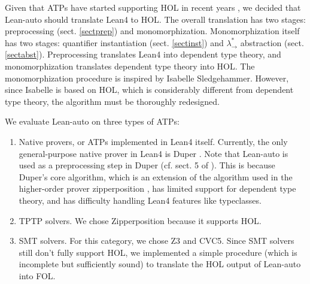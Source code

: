   Given that ATPs have started supporting HOL in recent years \cite{HOVampire}\cite{ZipperpositionMakeWork}\cite{HOEProver},
  we decided that Lean-auto should translate Lean4 to HOL. The overall translation has
  two stages: preprocessing (sect. \ref{sectprep}) and monomorphization.
  Monomorphization itself has two stages: quantifier instantiation (sect. \ref{sectinst})
  and $\lambda_\to^*$ abstraction (sect. \ref{sectabst}). Preprocessing translates Lean4
  into dependent type theory, and monomorphization translates dependent type theory
  into HOL. The monomorphization procedure is inspired by Isabelle Sledgehammer.
  However, since Isabelle is based on HOL, which is considerably different from
  dependent type theory, the algorithm must be thoroughly redesigned.
  
  We evaluate Lean-auto on three types of ATPs:
  \begin{enumerate}
    \item Native provers, or ATPs implemented in Lean4 itself. Currently, the only general-purpose
      native prover in Lean4 is Duper \cite{DuperPaper}. Note that Lean-auto is
      used as a preprocessing step in Duper (cf. sect. 5 of \cite{DuperPaper}).
      This is because Duper's core algorithm, which is an extension of the algorithm used
      in the higher-order prover zipperposition \cite{ZipperpositionMakeWork}, has limited support for dependent
      type theory, and has difficulty handling Lean4 features like typeclasses.
    \item TPTP solvers. We chose Zipperposition because it supports HOL.
    \item SMT solvers. For this category, we chose Z3 and CVC5. Since SMT solvers
      still don't fully support HOL, we implemented a simple procedure
      (which is incomplete but sufficiently sound) to translate the HOL output of Lean-auto into FOL.
  \end{enumerate}
